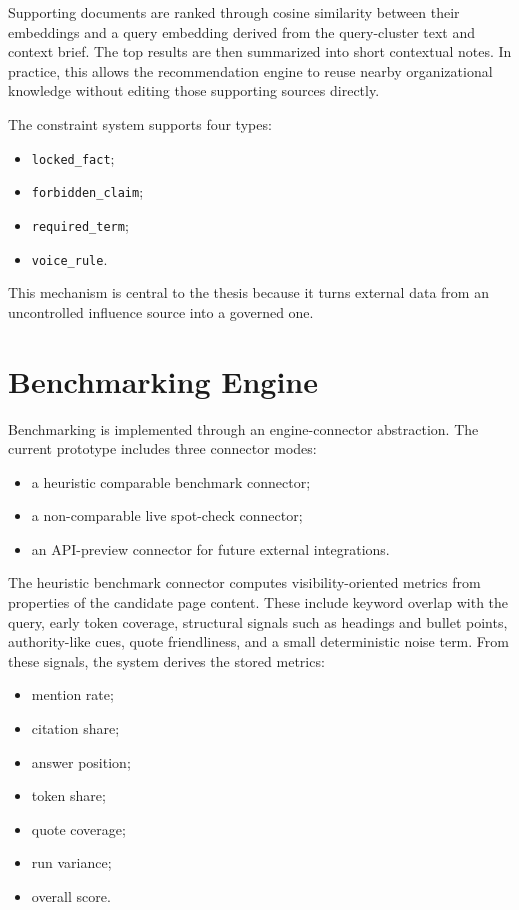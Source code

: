 Supporting documents are ranked through cosine similarity between their embeddings and a
query embedding derived from the query-cluster text and context brief. The top results are then
summarized into short contextual notes. In practice, this allows the recommendation engine to
reuse nearby organizational knowledge without editing those supporting sources directly.

The constraint system supports four types:
\begin{itemize}
    \item \texttt{locked\_fact};
    \item \texttt{forbidden\_claim};
    \item \texttt{required\_term};
    \item \texttt{voice\_rule}.
\end{itemize}

This mechanism is central to the thesis because it turns external data from an uncontrolled
influence source into a governed one.

\section{Benchmarking Engine}

Benchmarking is implemented through an engine-connector abstraction. The current prototype
includes three connector modes:
\begin{itemize}
    \item a heuristic comparable benchmark connector;
    \item a non-comparable live spot-check connector;
    \item an API-preview connector for future external integrations.
\end{itemize}

The heuristic benchmark connector computes visibility-oriented metrics from properties of the
candidate page content. These include keyword overlap with the query, early token coverage,
structural signals such as headings and bullet points, authority-like cues, quote friendliness,
and a small deterministic noise term. From these signals, the system derives the stored metrics:
\begin{itemize}
    \item mention rate;
    \item citation share;
    \item answer position;
    \item token share;
    \item quote coverage;
    \item run variance;
    \item overall score.
\end{itemize}

